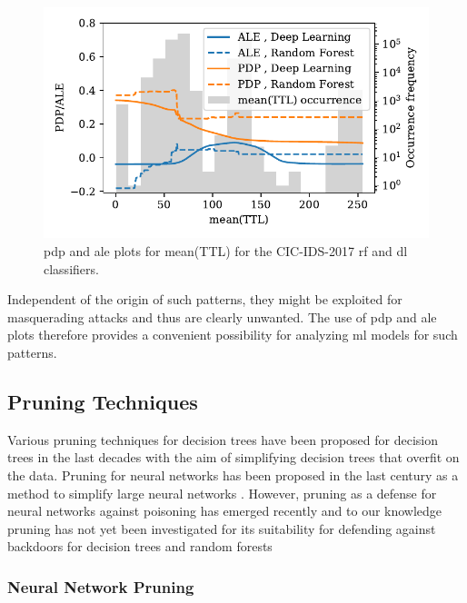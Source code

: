 \documentclass[10pt,sigconf,letterpaper,dvipsnames]{acmart}
\begin{document}
\begin{figure}[b]
\includegraphics[width=\columnwidth]{figures/ttlmean.pdf}
\caption{\gls{pdp} and \gls{ale} plots for mean(TTL) for the CIC-IDS-2017 \gls{rf} and \gls{dl} classifiers.}
\label{fig:ttlmean}
\end{figure}
Independent of the origin of such patterns, they might be exploited for masquerading attacks and thus are clearly unwanted. The use of \gls{pdp} and \gls{ale} plots therefore provides a convenient possibility for analyzing \gls{ml} models for such patterns.
\subsection{Pruning Techniques}

Various pruning techniques for decision trees have been proposed for decision trees in the last decades \cite{esposito_comparative_1997} with the aim of simplifying decision trees that overfit on the data. Pruning for neural networks has been proposed in the last century as a method to simplify large neural networks \cite{sietsma_neural_1988}. However, pruning as a defense for neural networks against poisoning has emerged recently \cite{gu_badnets:_2017} and to our knowledge pruning has not yet been investigated for its suitability for defending against backdoors for decision trees and random forests

\subsubsection{Neural Network Pruning}
\end{document}
